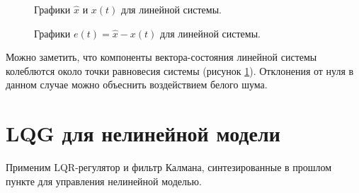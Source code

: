 \begin{figure}[!h]
	\caption{Графики $\hat{x}$ и $x(t)$ для линейной системы.}
	\label{6_lqg_lin2}
\end{figure}

\begin{figure}[!h]
	\caption{Графики $e(t) =\hat{x}- x(t)$ для линейной системы.}
	\label{6_lqg_lin2_e}
\end{figure}

Можно заметить, что компоненты вектора-состояния линейной системы колеблются около точки равновесия системы (рисунок \ref{6_lqg_lin2}). Отклонения от нуля в данном случае можно объеснить воздействием белого шума.


\section{LQG для нелинейной модели}

Применим LQR-регулятор и фильтр Калмана, синтезированные в прошлом пункте для управления нелинейной моделью.

